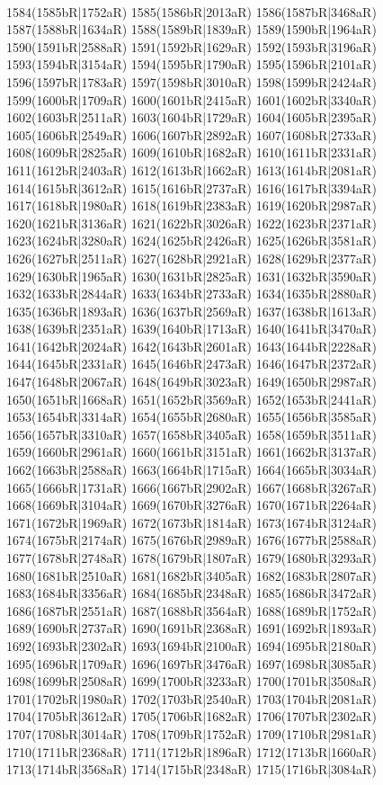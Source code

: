 \\1584(1585bR|1752aR) 1585(1586bR|2013aR) 1586(1587bR|3468aR) 1587(1588bR|1634aR) 1588(1589bR|1839aR) 1589(1590bR|1964aR) 1590(1591bR|2588aR) 1591(1592bR|1629aR) 1592(1593bR|3196aR) \\1593(1594bR|3154aR) 1594(1595bR|1790aR) 1595(1596bR|2101aR) 1596(1597bR|1783aR) 1597(1598bR|3010aR) 1598(1599bR|2424aR) 1599(1600bR|1709aR) 1600(1601bR|2415aR) 1601(1602bR|3340aR) \\1602(1603bR|2511aR) 1603(1604bR|1729aR) 1604(1605bR|2395aR) 1605(1606bR|2549aR) 1606(1607bR|2892aR) 1607(1608bR|2733aR) 1608(1609bR|2825aR) 1609(1610bR|1682aR) 1610(1611bR|2331aR) \\1611(1612bR|2403aR) 1612(1613bR|1662aR) 1613(1614bR|2081aR) 1614(1615bR|3612aR) 1615(1616bR|2737aR) 1616(1617bR|3394aR) 1617(1618bR|1980aR) 1618(1619bR|2383aR) 1619(1620bR|2987aR) \\1620(1621bR|3136aR) 1621(1622bR|3026aR) 1622(1623bR|2371aR) 1623(1624bR|3280aR) 1624(1625bR|2426aR) 1625(1626bR|3581aR) 1626(1627bR|2511aR) 1627(1628bR|2921aR) 1628(1629bR|2377aR) \\1629(1630bR|1965aR) 1630(1631bR|2825aR) 1631(1632bR|3590aR) 1632(1633bR|2844aR) 1633(1634bR|2733aR) 1634(1635bR|2880aR) 1635(1636bR|1893aR) 1636(1637bR|2569aR) 1637(1638bR|1613aR) \\1638(1639bR|2351aR) 1639(1640bR|1713aR) 1640(1641bR|3470aR) 1641(1642bR|2024aR) 1642(1643bR|2601aR) 1643(1644bR|2228aR) 1644(1645bR|2331aR) 1645(1646bR|2473aR) 1646(1647bR|2372aR) \\1647(1648bR|2067aR) 1648(1649bR|3023aR) 1649(1650bR|2987aR) 1650(1651bR|1668aR) 1651(1652bR|3569aR) 1652(1653bR|2441aR) 1653(1654bR|3314aR) 1654(1655bR|2680aR) 1655(1656bR|3585aR) \\1656(1657bR|3310aR) 1657(1658bR|3405aR) 1658(1659bR|3511aR) 1659(1660bR|2961aR) 1660(1661bR|3151aR) 1661(1662bR|3137aR) 1662(1663bR|2588aR) 1663(1664bR|1715aR) 1664(1665bR|3034aR) \\1665(1666bR|1731aR) 1666(1667bR|2902aR) 1667(1668bR|3267aR) 1668(1669bR|3104aR) 1669(1670bR|3276aR) 1670(1671bR|2264aR) 1671(1672bR|1969aR) 1672(1673bR|1814aR) 1673(1674bR|3124aR) \\1674(1675bR|2174aR) 1675(1676bR|2989aR) 1676(1677bR|2588aR) 1677(1678bR|2748aR) 1678(1679bR|1807aR) 1679(1680bR|3293aR) 1680(1681bR|2510aR) 1681(1682bR|3405aR) 1682(1683bR|2807aR) \\1683(1684bR|3356aR) 1684(1685bR|2348aR) 1685(1686bR|3472aR) 1686(1687bR|2551aR) 1687(1688bR|3564aR) 1688(1689bR|1752aR) 1689(1690bR|2737aR) 1690(1691bR|2368aR) 1691(1692bR|1893aR) \\1692(1693bR|2302aR) 1693(1694bR|2100aR) 1694(1695bR|2180aR) 1695(1696bR|1709aR) 1696(1697bR|3476aR) 1697(1698bR|3085aR) 1698(1699bR|2508aR) 1699(1700bR|3233aR) 1700(1701bR|3508aR) \\1701(1702bR|1980aR) 1702(1703bR|2540aR) 1703(1704bR|2081aR) 1704(1705bR|3612aR) 1705(1706bR|1682aR) 1706(1707bR|2302aR) 1707(1708bR|3014aR) 1708(1709bR|1752aR) 1709(1710bR|2981aR) \\1710(1711bR|2368aR) 1711(1712bR|1896aR) 1712(1713bR|1660aR) 1713(1714bR|3568aR) 1714(1715bR|2348aR) 1715(1716bR|3084aR) 